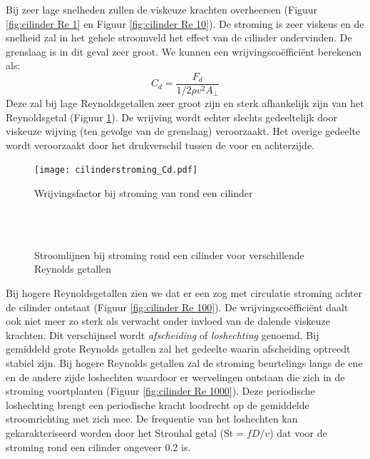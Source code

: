 Bij zeer lage snelheden zullen de viskeuze krachten overheersen (Figuur \ref{fig:cilinder Re 1} en Figuur \ref{fig:cilinder Re 10}). De stroming is zeer viskeus en de snelheid zal in het gehele stroomveld het effect van de cilinder ondervinden. De grenslaag is in dit geval zeer groot.
We kunnen een wrijvingscoëfficiënt berekenen als:
\begin{equation}
	C_d = \frac{F_d}{1/2 \rho v^2 A_{\perp}}
	\label{eqn:wrijvingscoefficient}
\end{equation}
Deze zal bij lage Reynoldsgetallen zeer groot zijn en sterk afhankelijk zijn van het Reynoldsgetal (Figuur \ref{fig:cilinderstroming_cd}). De wrijving wordt echter slechts gedeeltelijk door viskeuze wijving (ten gevolge van de grenslaag) veroorzaakt. Het overige gedeelte wordt veroorzaakt door het drukverschil tussen de voor en achterzijde.
\begin{figure}[htb]
	\centering
	\texttt{[image: cilinderstroming\_Cd.pdf]}
	\caption{Wrijvingsfactor bij stroming van rond een cilinder }
	\label{fig:cilinderstroming_cd}
\end{figure}
\begin{figure}[htb]
	\centering
	 \quad
	\\
	 \quad
	\\
	\caption{Stroomlijnen bij stroming rond een cilinder voor verschillende Reynolds getallen}
	\label{fig:Sroomlijnen bij stroming rond een cilinder}
\end{figure}

Bij hogere Reynoldsgetallen zien we dat er een zog met circulatie stroming achter de cilinder ontstaat (Figuur \ref{fig:cilinder Re 100}). De wrijvingscoëfficiënt daalt ook niet meer zo sterk als verwacht onder invloed van de dalende viskeuze krachten. Dit verschijnsel wordt \emph{afscheiding} of \emph{loshechting} genoemd. Bij gemiddeld grote Reynolds getallen zal het gedeelte waarin afscheiding optreedt stabiel zijn. Bij hogere Reynolds getallen zal de stroming beurtelings langs de ene en de andere zijde loshechten waardoor er wervelingen ontstaan die zich in de stroming voortplanten (Figuur \ref{fig:cilinder Re 1000}). Deze periodische loshechting brengt een periodische kracht loodrecht op de gemiddelde stroomrichting met zich mee. De frequentie van het loshechten kan gekarakteriseerd worden door het Strouhal getal ($\text{St} = fD/v$) dat voor de stroming rond een cilinder ongeveer 0.2 is.

